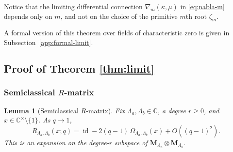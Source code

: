 \documentclass[12pt]{amsart}
\newtheorem{lem}[thm]{Lemma}
\theoremstyle{definition}
\numberwithin{equation}{section}
\theoremstyle{definition}
\let\ka\kappa
\let\La\Lambda
\let\Om\Omega
\let\ox\otimes
\let\ge\geqslant
\let\on\operatorname
\def\C{{\mathbb C}}
\def\id{\on{id}}
\def\beq{\begin{equation}}
\def\eeq{\end{equation}}
\begin{document}
Notice that the limiting differential connection
$\nabla_m(\ka,\mu)$ in \eqref{eq:nabla-m} depends only on
$m$, and not on the choice of the primitive $m$th root
$\zeta_m$.

A formal version of this theorem over fields of characteristic zero
is given in Subsection~\ref{app:formal-limit}.

\subsection{Proof of Theorem \ref{thm:limit}}\label{sec:proof}

\subsubsection{Semiclassical \texorpdfstring{$R$}{R}-matrix}

\begin{lem}[Semiclassical $R$-matrix]\label{lem:R-expand}
Fix $\La_a,\La_b\in\C$, a degree $r\ge0$, and
$x\in\C^\times\setminus\{1\}$. As $q\to1$,
\beq\label{eq:R-expand}
 R_{\La_a,\La_b}(x;q)
 =\id-2(q-1)\,\Om_{\La_a,\La_b}(x)+O((q-1)^2).
\eeq
This is an expansion on the degree-$r$ subspace of
$\mathbf M_{\La_a}\ox\mathbf M_{\La_b}$.
\end{lem}
\end{document}
